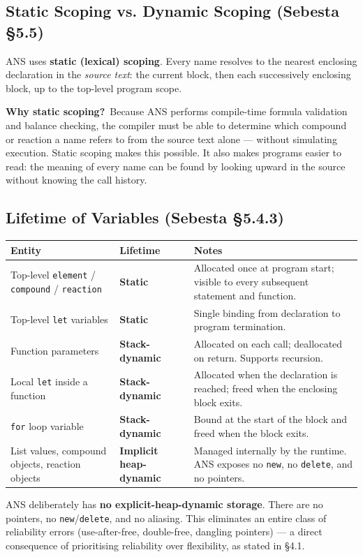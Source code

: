 \documentclass[11pt,a4paper]{article}
\newcommand{\code}[1]{\texttt{#1}}
\begin{document}
\subsection{Static Scoping vs. Dynamic Scoping (Sebesta \S5.5)}
ANS uses \textbf{static (lexical) scoping}. Every name resolves to the nearest enclosing declaration in the \textit{source text}: the current block, then each successively enclosing block, up to the top-level program scope.

\textbf{Why static scoping?}\, Because ANS performs compile-time formula validation and balance checking, the compiler must be able to determine which compound or reaction a name refers to from the source text alone --- without simulating execution. Static scoping makes this possible. It also makes programs easier to read: the meaning of every name can be found by looking upward in the source without knowing the call history.

\subsection{Lifetime of Variables (Sebesta \S5.4.3)}
\begin{table}[h]
\centering
\begin{tabularx}{\textwidth}{@{} p{4.5cm} p{3.5cm} Y @{}}
\toprule
\textbf{Entity} & \textbf{Lifetime} & \textbf{Notes} \\
\midrule
Top-level \code{element} / \code{compound} / \code{reaction} & \textbf{Static} & Allocated once at program start; visible to every subsequent statement and function. \\
Top-level \code{let} variables & \textbf{Static} & Single binding from declaration to program termination. \\
Function parameters & \textbf{Stack-dynamic} & Allocated on each call; deallocated on return. Supports recursion. \\
Local \code{let} inside a function & \textbf{Stack-dynamic} & Allocated when the declaration is reached; freed when the enclosing block exits. \\
\code{for} loop variable & \textbf{Stack-dynamic} & Bound at the start of the block and freed when the block exits. \\
List values, compound objects, reaction objects & \textbf{Implicit heap-dynamic} & Managed internally by the runtime. ANS exposes no \code{new}, no \code{delete}, and no pointers. \\
\bottomrule
\end{tabularx}
\end{table}

ANS deliberately has \textbf{no explicit-heap-dynamic storage}. There are no pointers, no \code{new}/\code{delete}, and no aliasing. This eliminates an entire class of reliability errors (use-after-free, double-free, dangling pointers) --- a direct consequence of prioritising reliability over flexibility, as stated in \S4.1.
\end{document}
